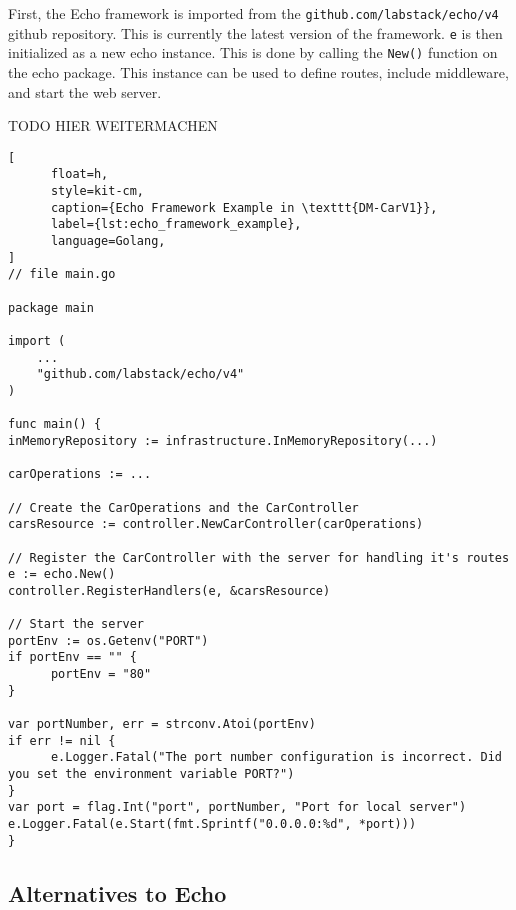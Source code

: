 First, the Echo framework is imported from the \texttt{github.com/labstack/echo/v4} github repository.
This is currently the latest version of the framework.
\texttt{e} is then initialized as a new echo instance.
This is done by calling the \texttt{New()} function on the echo package.
This instance can be used to define routes, include middleware, and start the web server.

TODO HIER WEITERMACHEN

\begin{lstlisting}[
      float=h,
      style=kit-cm,
      caption={Echo Framework Example in \texttt{DM-CarV1}},
      label={lst:echo_framework_example},
      language=Golang,
]
// file main.go

package main

import (
	...
	"github.com/labstack/echo/v4"
)

func main() {
inMemoryRepository := infrastructure.InMemoryRepository(...)

carOperations := ...

// Create the CarOperations and the CarController
carsResource := controller.NewCarController(carOperations)

// Register the CarController with the server for handling it's routes
e := echo.New()
controller.RegisterHandlers(e, &carsResource)

// Start the server
portEnv := os.Getenv("PORT")
if portEnv == "" {
      portEnv = "80"
}

var portNumber, err = strconv.Atoi(portEnv)
if err != nil {
      e.Logger.Fatal("The port number configuration is incorrect. Did you set the environment variable PORT?")
}
var port = flag.Int("port", portNumber, "Port for local server")
e.Logger.Fatal(e.Start(fmt.Sprintf("0.0.0.0:%d", *port)))
}
\end{lstlisting}

\subsection{Alternatives to Echo}